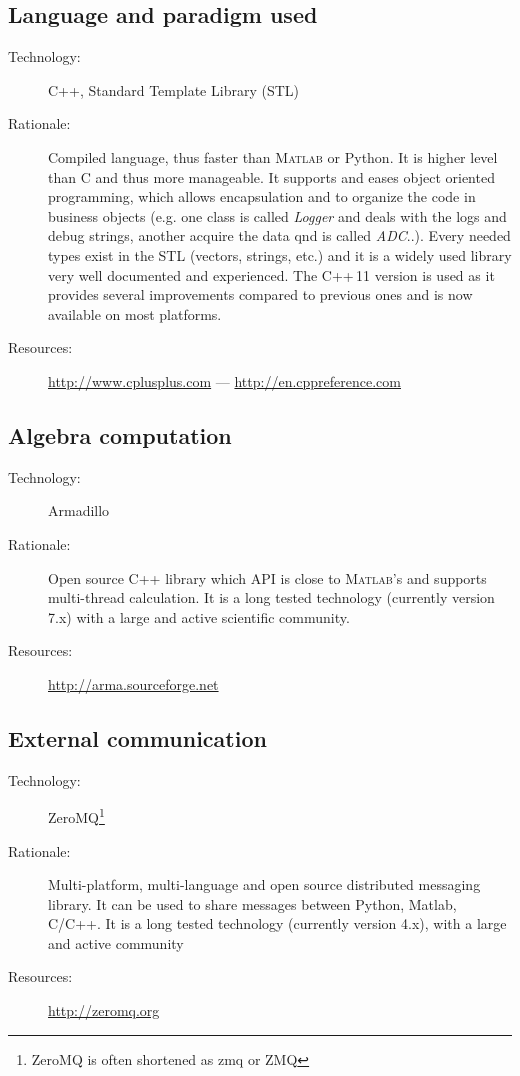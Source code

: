 \subsection{Language and paradigm used}
\begin{description}
    \item[Technology:] C++, Standard Template Library (STL)
    \item[Rationale:] Compiled language, thus faster than \textsc{Matlab} or Python. It is higher level than C and thus more manageable. It supports and eases object oriented programming, which allows encapsulation and to organize the code in business objects (e.g. one class is called \textit{Logger} and deals with the logs and debug strings, another acquire the data qnd is called \textit{ADC}..). Every needed types exist in the STL (vectors, strings, etc.) and it is a widely used library very well documented and experienced. The C++\,11 version is used as it provides several improvements compared to previous ones and is now available on most platforms.
    \item[Resources:] \url{http://www.cplusplus.com} --- \url{http://en.cppreference.com}
\end{description}

\subsection{Algebra computation}
\begin{description}
    \item[Technology:] Armadillo
    \item[Rationale:] Open source C++ library which API is close to \textsc{Matlab}'s and supports multi-thread calculation. It is a long tested technology (currently version 7.x) with a large and active scientific community.
    \item[Resources:] \url{http://arma.sourceforge.net}
\end{description}

\subsection{External communication}
\begin{description}
   \item[Technology:] ZeroMQ\footnote{ZeroMQ is often shortened as zmq or ZMQ}
   \item[Rationale:] Multi-platform, multi-language and open source distributed messaging library. It can be used to share messages between Python, Matlab, C/C++. It is a long tested technology (currently version 4.x), with a large and active community
   \item[Resources:] \url{http://zeromq.org}
\end{description}

